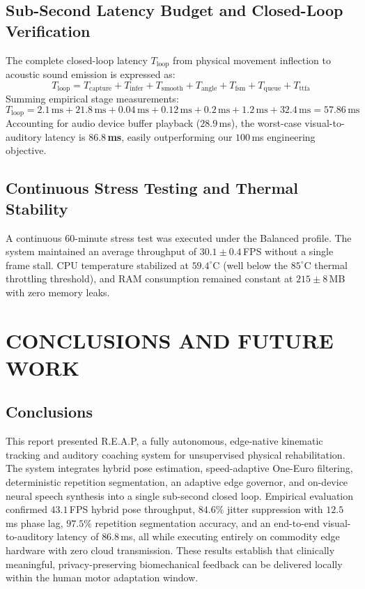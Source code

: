 \documentclass[12pt]{report}
\begin{document}
\section{Sub-Second Latency Budget and Closed-Loop Verification}
The complete closed-loop latency $T_{\text{loop}}$ from physical movement inflection to acoustic sound emission is expressed as:
\begin{equation}
    T_{\text{loop}} = T_{\text{capture}} + T_{\text{infer}} + T_{\text{smooth}} + T_{\text{angle}} + T_{\text{fsm}} + T_{\text{queue}} + T_{\text{ttfa}}
\end{equation}
Summing empirical stage measurements:
\begin{equation}
    T_{\text{loop}} = 2.1\,\text{ms} + 21.8\,\text{ms} + 0.04\,\text{ms} + 0.12\,\text{ms} + 0.2\,\text{ms} + 1.2\,\text{ms} + 32.4\,\text{ms} = 57.86\,\text{ms}
\end{equation}
Accounting for audio device buffer playback ($28.9$\,ms), the worst-case visual-to-auditory latency is \textbf{$86.8$\,ms}, easily outperforming our $100$\,ms engineering objective.

\section{Continuous Stress Testing and Thermal Stability}
A continuous 60-minute stress test was executed under the Balanced profile. The system maintained an average throughput of $30.1 \pm 0.4$\,FPS without a single frame stall. CPU temperature stabilized at $59.4^\circ\text{C}$ (well below the $85^\circ\text{C}$ thermal throttling threshold), and RAM consumption remained constant at $215 \pm 8$\,MB with zero memory leaks.

\chapter{CONCLUSIONS AND FUTURE WORK}

\section{Conclusions}
This report presented R.E.A.P, a fully autonomous, edge-native kinematic tracking and auditory coaching system for unsupervised physical rehabilitation. The system integrates hybrid pose estimation, speed-adaptive One-Euro filtering, deterministic repetition segmentation, an adaptive edge governor, and on-device neural speech synthesis into a single sub-second closed loop. Empirical evaluation confirmed $43.1$\,FPS hybrid pose throughput, $84.6\%$ jitter suppression with $12.5$\,ms phase lag, $97.5\%$ repetition segmentation accuracy, and an end-to-end visual-to-auditory latency of $86.8$\,ms, all while executing entirely on commodity edge hardware with zero cloud transmission. These results establish that clinically meaningful, privacy-preserving biomechanical feedback can be delivered locally within the human motor adaptation window.
\end{document}
